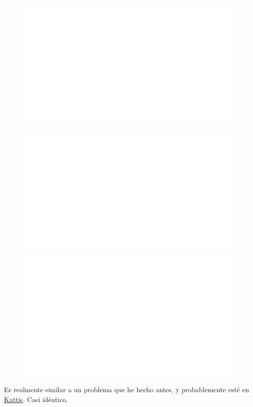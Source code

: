 \begin{centering}
    \begin{figure}[h!]
        \centering
        \includegraphics[width=\textwidth]{whyareyoucheckingthenameofthisfile.png}
    \end{figure}
\end{centering}

\begin{centering}
    \begin{figure}[h]
        \centering
        \includegraphics[width=\textwidth]{whyareyoucheckingthenameofthisfile.png}
    \end{figure}
\end{centering}

\begin{centering}
    \begin{figure}
        \centering
        \includegraphics[width=\textwidth]{whyareyoucheckingthenameofthisfile.png}
    \end{figure}
\end{centering}
\noindent

Es realmente similar a un problema que he hecho antes, y probablemente esté en \href{https://www.youtube.com/watch?v=dQw4w9WgXcQ}{Kattis}. Casi idéntico. 


